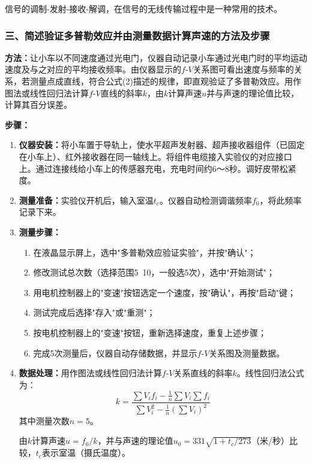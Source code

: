 \documentclass[dvipsnames, svgnames,a4paper,11pt]{article}
\begin{document}
信号的调制-发射-接收-解调，在信号的无线传输过程中是一种常用的技术。

\subsubsection{三、简述验证多普勒效应并由测量数据计算声速的方法及步骤}

\textbf{方法：}让小车以不同速度通过光电门，仪器自动记录小车通过光电门时的平均运动速度及与之对应的平均接收频率。由仪器显示的$f$-$V$关系图可看出速度与频率的关系，若测量点成直线，符合公式(2)描述的规律，即直观验证了多普勒效应。用作图法或线性回归法计算$f$-$V$直线的斜率$k$，由$k$计算声速$u$并与声速的理论值比较，计算其百分误差。

\textbf{步骤：}
\begin{enumerate}
	\item \textbf{仪器安装：}将小车置于导轨上，使水平超声发射器、超声接收器组件（已固定在小车上）、红外接收器在同一轴线上。将组件电缆接入实验仪的对应接口上。通过连接线给小车上的传感器充电，充电时间约6～8秒。调好皮带松紧度。
	
	\item \textbf{测量准备：}实验仪开机后，输入室温$t_c$。仪器自动检测调谐频率$f_0$，将此频率记录下来。
	
	\item \textbf{测量步骤：}
	\begin{enumerate}
		\item 在液晶显示屏上，选中"多普勒效应验证实验"，并按"确认"；
		\item 修改测试总次数（选择范围5~10，一般选5次），选中"开始测试"；
		\item 用电机控制器上的"变速"按钮选定一个速度，按"确认"，再按"启动"键；
		\item 测试完成后选择"存入"或"重测"；
		\item 按电机控制器上的"变速"按钮，重新选择速度，重复上述步骤；
		\item 完成5次测量后，仪器自动存储数据，并显示$f$-$V$关系图及测量数据。
	\end{enumerate}
	
	\item \textbf{数据处理：}用作图法或线性回归法计算$f$-$V$关系直线的斜率$k$。线性回归法公式为：
	\begin{equation}
		k = \frac{\sum V_i f_i - \frac{1}{n}\sum V_i \sum f_i}{\sum V_i^2 - \frac{1}{n}(\sum V_i)^2}
	\end{equation}
	其中测量次数$n=5$。
	
	由$k$计算声速$u = f_0/k$，并与声速的理论值$u_0 = 331\sqrt{1+t_c/273}$（米/秒）比较，$t_c$表示室温（摄氏温度）。
\end{enumerate}
\end{document}
